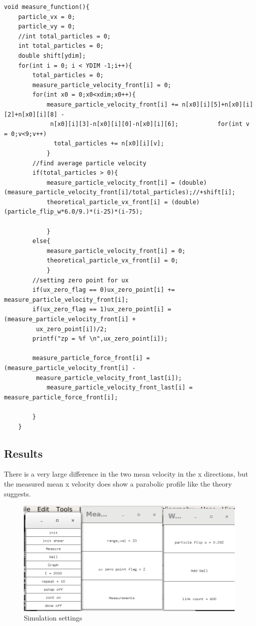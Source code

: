 \documentclass{article}
\begin{document}
\vspace{5mm}
\begin{verbatim}
void measure_function(){
	particle_vx = 0;
	particle_vy = 0;
	//int total_particles = 0;
	int total_particles = 0;
	double shift[ydim];
	for(int i = 0; i < YDIM -1;i++){
		total_particles = 0;
		measure_particle_velocity_front[i] = 0;
		for(int x0 = 0;x0<xdim;x0++){
			measure_particle_velocity_front[i] += n[x0][i][5]+n[x0][i][2]+n[x0][i][8] -
			 n[x0][i][3]-n[x0][i][0]-n[x0][i][6];			for(int v = 0;v<9;v++)
			  total_particles += n[x0][i][v];	
			}
		//find average particle velocity
		if(total_particles > 0){
			measure_particle_velocity_front[i] = (double)(measure_particle_velocity_front[i]/total_particles);//+shift[i];
			theoretical_particle_vx_front[i] = (double)(particle_flip_w*6.0/9.)*(i-25)*(i-75);

			}
		else{
			measure_particle_velocity_front[i] = 0;
			theoretical_particle_vx_front[i] = 0;
			}
		//setting zero point for ux
		if(ux_zero_flag == 0)ux_zero_point[i] += measure_particle_velocity_front[i];
		if(ux_zero_flag == 1)ux_zero_point[i] = (measure_particle_velocity_front[i] +
		 ux_zero_point[i])/2; 
		printf("zp = %f \n",ux_zero_point[i]);
			
		measure_particle_force_front[i] = (measure_particle_velocity_front[i] -
		 measure_particle_velocity_front_last[i]);	
		 	measure_particle_velocity_front_last[i] = measure_particle_force_front[i];
		
		}
	}

 \end{verbatim}
\vspace{5mm}


\subsection{Results}

There is a very large difference in the two mean velocity in the x directions, but the measured mean x velocity does show a parabolic profile like the theory suggests.

\begin{figure}[H]
\includegraphics[scale=0.35]{A2p1.png}
\caption{\label{fig} Simulation settings}
\end{figure}
\end{document}
